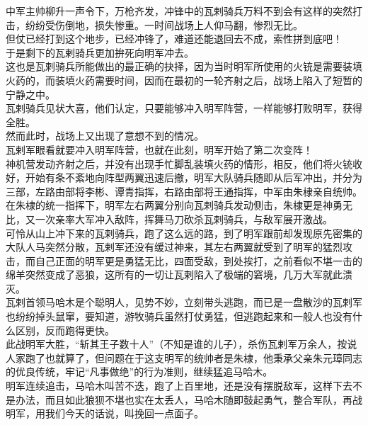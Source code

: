 \begin{multicols}{\theparacolNo}
中军主帅柳升一声令下，万枪齐发，冲锋中的瓦剌骑兵万料不到会有这样的突然打击，纷纷受伤倒地，损失惨重。一时间战场上人仰马翻，惨烈无比。\\

但仗已经打到这个地步，已经冲锋了，难道还能退回去不成，索性拼到底吧！\\

于是剩下的瓦剌骑兵更加拚死向明军冲去。\\

这也是瓦剌骑兵所能做出的最正确的抉择，因为当时明军所使用的火铳是需要装填火药的，而装填火药需要时间，因而在最初的一轮齐射之后，战场上陷入了短暂的宁静之中。\\

瓦剌骑兵见状大喜，他们认定，只要能够冲入明军阵营，一样能够打败明军，获得全胜。\\

然而此时，战场上又出现了意想不到的情况。\\

瓦剌军眼看就要冲入明军阵营，也就在此刻，明军开始了第二次变阵！\\

神机营发动齐射之后，并没有出现手忙脚乱装填火药的情形，相反，他们将火铳收好，开始有条不紊地向阵型两翼迅速后撤，明军大队骑兵随即从后军冲出，并分为三部，左路由部将李彬、谭青指挥，右路由部将王通指挥，中军由朱棣亲自统帅。\\

在朱棣的统一指挥下，明军左右两翼分别向瓦剌骑兵发动侧击，朱棣更是神勇无比，又一次亲率大军冲入敌阵，挥舞马刀砍杀瓦剌骑兵，与敌军展开激战。\\

可怜从山上冲下来的瓦剌骑兵，跑了这么远的路，到了明军跟前却发现原先密集的大队人马突然分散，瓦剌军还没有缓过神来，其左右两翼就受到了明军的猛烈攻击，而自己正面的明军更是勇猛无比，四面受敌，到处挨打，之前看似不堪一击的绵羊突然变成了恶狼，这所有的一切让瓦剌陷入了极端的窘境，几万大军就此溃灭。\\

瓦剌首领马哈木是个聪明人，见势不妙，立刻带头逃跑，而已是一盘散沙的瓦剌军也纷纷掉头鼠窜，要知道，游牧骑兵虽然打仗勇猛，但逃跑起来和一般人也没有什么区别，反而跑得更快。\\

此战明军大胜，“斩其王子数十人”（不知是谁的儿子），杀伤瓦剌军万余人，按说人家跑了也就算了，但问题在于这支明军的统帅者是朱棣，他秉承父亲朱元璋同志的优良传统，牢记“凡事做绝”的行为准则，继续猛追马哈木。\\

明军连续追击，马哈木叫苦不迭，跑了上百里地，还是没有摆脱敌军，这样下去不是办法，而且如此狼狈不堪也实在太丢人，马哈木随即鼓起勇气，整合军队，再战明军，用我们今天的话说，叫挽回一点面子。\\


\end{multicols}
